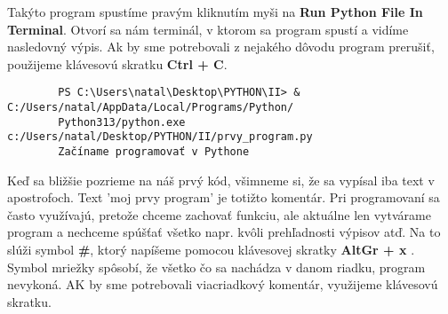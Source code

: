 \documentclass[a4paper,11pt]{report}
\begin{document}
	Takýto program spustíme pravým kliknutím myši na \textbf{Run Python File In Terminal}. Otvorí sa nám terminál, v ktorom sa program spustí a vidíme nasledovný výpis. Ak by sme potrebovali z nejakého dôvodu program prerušiť, použijeme klávesovú skratku \textbf{Ctrl + C}. 

	\begin{verbatim}
		PS C:\Users\natal\Desktop\PYTHON\II> & C:/Users/natal/AppData/Local/Programs/Python/
		Python313/python.exe c:/Users/natal/Desktop/PYTHON/II/prvy_program.py
		Začíname programovať v Pythone
	\end{verbatim}
	
	Keď sa bližšie pozrieme na náš prvý kód, všimneme si, že sa vypísal iba text v apostrofoch. Text 'moj prvy program' je totižto komentár. Pri programovaní sa často využívajú, pretože chceme zachovať funkciu, ale aktuálne len vytvárame program a nechceme spúšťať všetko napr. kvôli prehľadnosti výpisov atď. Na to slúži symbol \textbf{\#}, ktorý napíšeme pomocou klávesovej skratky \textbf{AltGr + x }. Symbol mriežky spôsobí, že všetko čo sa nachádza v danom riadku, program nevykoná. AK by sme potrebovali viacriadkový komentár, využijeme klávesovú skratku. 
	
	
\end{document}
